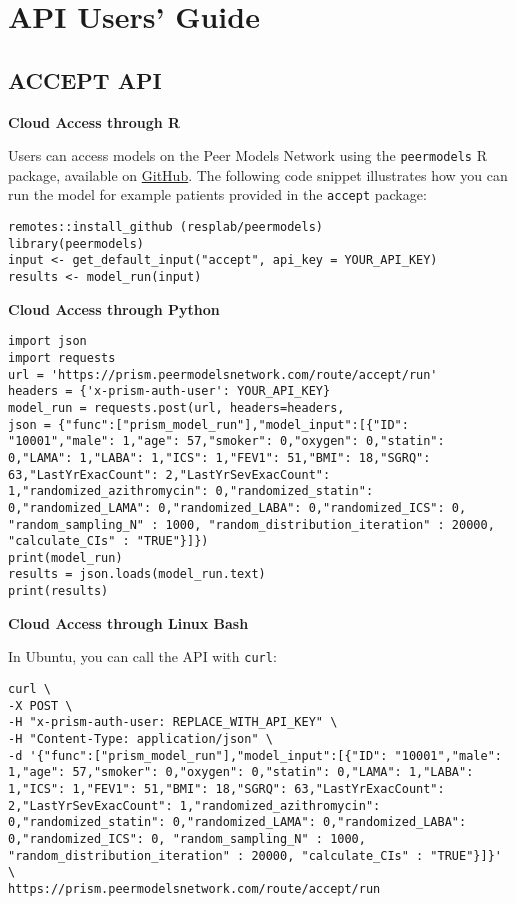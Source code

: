 \documentclass[
]{book}
\begin{document}
\hypertarget{api-users-guide}{%
\chapter{API Users' Guide}\label{api-users-guide}}

\hypertarget{accept-api}{%
\section{ACCEPT API}\label{accept-api}}

\textbf{Cloud Access through R}

Users can access models on the Peer Models Network using the \texttt{peermodels} R package, available on \href{https://github.com/resplab/peermodels}{GitHub}. The following code snippet illustrates how you can run the model for example patients provided in the \texttt{accept} package:

\begin{verbatim}
remotes::install_github (resplab/peermodels)
library(peermodels)
input <- get_default_input("accept", api_key = YOUR_API_KEY)
results <- model_run(input)
\end{verbatim}

\textbf{Cloud Access through Python}

\begin{verbatim}
import json
import requests
url = 'https://prism.peermodelsnetwork.com/route/accept/run'
headers = {'x-prism-auth-user': YOUR_API_KEY}
model_run = requests.post(url, headers=headers,
json = {"func":["prism_model_run"],"model_input":[{"ID": "10001","male": 1,"age": 57,"smoker": 0,"oxygen": 0,"statin": 0,"LAMA": 1,"LABA": 1,"ICS": 1,"FEV1": 51,"BMI": 18,"SGRQ": 63,"LastYrExacCount": 2,"LastYrSevExacCount": 1,"randomized_azithromycin": 0,"randomized_statin": 0,"randomized_LAMA": 0,"randomized_LABA": 0,"randomized_ICS": 0, "random_sampling_N" : 1000, "random_distribution_iteration" : 20000, "calculate_CIs" : "TRUE"}]})
print(model_run)
results = json.loads(model_run.text)
print(results)
\end{verbatim}

\textbf{Cloud Access through Linux Bash}

In Ubuntu, you can call the API with \texttt{curl}:

\begin{verbatim}
curl \
-X POST \
-H "x-prism-auth-user: REPLACE_WITH_API_KEY" \
-H "Content-Type: application/json" \
-d '{"func":["prism_model_run"],"model_input":[{"ID": "10001","male": 1,"age": 57,"smoker": 0,"oxygen": 0,"statin": 0,"LAMA": 1,"LABA": 1,"ICS": 1,"FEV1": 51,"BMI": 18,"SGRQ": 63,"LastYrExacCount": 2,"LastYrSevExacCount": 1,"randomized_azithromycin": 0,"randomized_statin": 0,"randomized_LAMA": 0,"randomized_LABA": 0,"randomized_ICS": 0, "random_sampling_N" : 1000, "random_distribution_iteration" : 20000, "calculate_CIs" : "TRUE"}]}' \
https://prism.peermodelsnetwork.com/route/accept/run
\end{verbatim}
\end{document}
